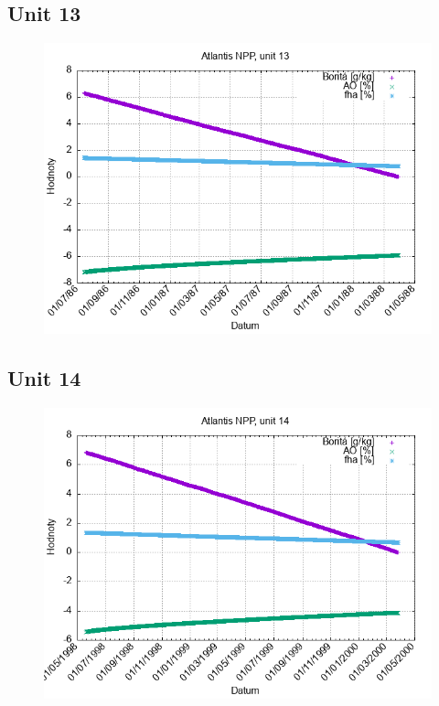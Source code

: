 \documentclass{article}
\begin{document}
\subsection*{Unit 13}
\begin{figure}[h!]
\centering
\includegraphics[width=14cm]{./grafy/Atlantis13.png}
\end{figure}
\clearpage
\subsection*{Unit 14}
\begin{figure}[h!]
\centering
\includegraphics[width=14cm]{./grafy/Atlantis14.png}
\end{figure}
\clearpage
\end{document}
